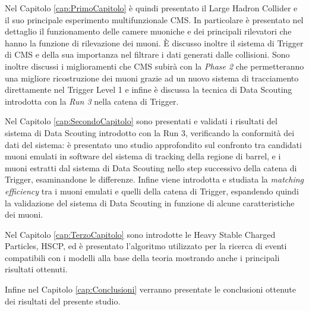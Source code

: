 Nel Capitolo \ref{cap:PrimoCapitolo} è quindi presentato il Large Hadron Collider e il suo principale esperimento multifunzionale CMS. In particolare è presentato nel dettaglio il funzionamento delle camere muoniche e dei principali rilevatori che hanno la funzione di rilevazione dei muoni. È discusso inoltre il sistema di Trigger di CMS e della sua importanza nel filtrare i dati generati dalle collisioni. Sono inoltre discussi i miglioramenti che CMS subirà con la \textit{Phase 2} che permetteranno una migliore ricostruzione dei muoni grazie ad un nuovo sistema di tracciamento direttamente nel Trigger Level 1 e infine è discussa la tecnica di Data Scouting introdotta con la \textit{Run 3} nella catena di Trigger.

Nel Capitolo \ref{cap:SecondoCapitolo} sono presentati e validati i risultati del sistema di Data Scouting introdotto con la Run 3, verificando la conformità dei dati del sistema: è presentato uno studio approfondito sul confronto tra candidati muoni emulati in software del sistema di tracking della regione di barrel, e i muoni estratti dal sistema di Data Scouting nello step successivo della catena di Trigger, esaminandone le differenze. Infine viene introdotta e studiata la \textit{matching efficiency} tra i muoni emulati e quelli della catena di Trigger, espandendo quindi la validazione del sistema di Data Scouting in funzione di alcune caratteristiche dei muoni.

Nel Capitolo \ref{cap:TerzoCapitolo} sono introdotte le Heavy Stable Charged Particles, HSCP, ed è presentato l'algoritmo utilizzato per la ricerca di eventi compatibili con i modelli alla base della teoria mostrando anche i principali risultati ottenuti.

Infine nel Capitolo \ref{cap:Conclusioni} verranno presentate le conclusioni ottenute dei risultati del presente studio. 

